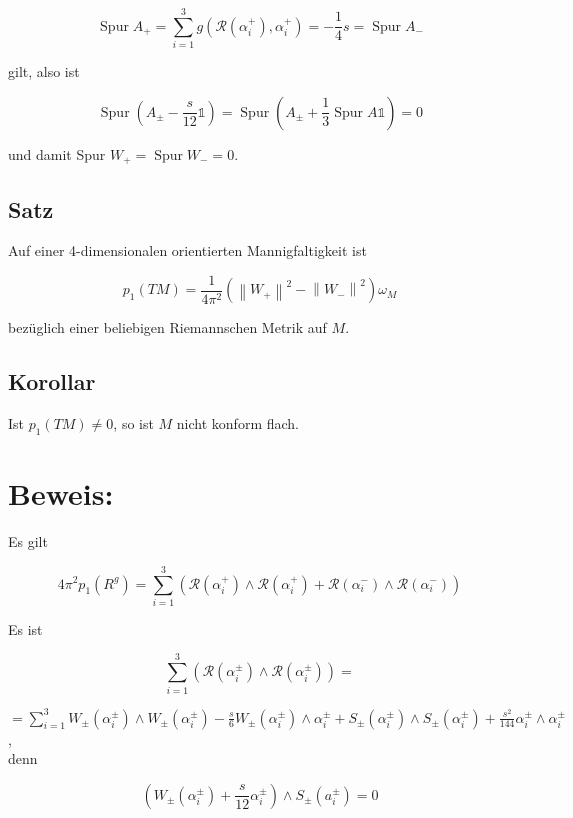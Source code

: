 \documentclass[10pt, letterpaper]{article}
\begin{document}
$$
\operatorname{Spur} A_{+}=\sum_{i=1}^{3} g\left(\mathcal{R}\left(\alpha_{i}^{+}\right), \alpha_{i}^{+}\right)=-\frac{1}{4} s=\operatorname{Spur} A_{-}
$$

gilt, also ist

$$
\operatorname{Spur}\left(A_{ \pm}-\frac{s}{12} \mathbb{1}\right)=\operatorname{Spur}\left(A_{ \pm}+\frac{1}{3} \operatorname{Spur} A \mathbb{1}\right)=0
$$

und damit Spur $W_{+}=\operatorname{Spur} W_{-}=0$.

\subsection*{Satz}
Auf einer 4-dimensionalen orientierten Mannigfaltigkeit ist

$$
p_{1}(T M)=\frac{1}{4 \pi^{2}}\left(\left\|W_{+}\right\|^{2}-\left\|W_{-}\right\|^{2}\right) \omega_{M}
$$

bezüglich einer beliebigen Riemannschen Metrik auf $M$.

\subsection*{Korollar}
Ist $p_{1}(T M) \neq 0$, so ist $M$ nicht konform flach.

\section*{Beweis:}
Es gilt

$$
4 \pi^{2} p_{1}\left(R^{g}\right)=\sum_{i=1}^{3}\left(\mathcal{R}\left(\alpha_{i}^{+}\right) \wedge \mathcal{R}\left(\alpha_{i}^{+}\right)+\mathcal{R}\left(\alpha_{i}^{-}\right) \wedge \mathcal{R}\left(\alpha_{i}^{-}\right)\right)
$$

Es ist

$$
\sum_{i=1}^{3}\left(\mathcal{R}\left(\alpha_{i}^{ \pm}\right) \wedge \mathcal{R}\left(\alpha_{i}^{ \pm}\right)\right)=
$$

$=\sum_{i=1}^{3} W_{ \pm}\left(\alpha_{i}^{ \pm}\right) \wedge W_{ \pm}\left(\alpha_{i}^{ \pm}\right)-\frac{s}{6} W_{ \pm}\left(\alpha_{i}^{ \pm}\right) \wedge \alpha_{i}^{ \pm}+S_{ \pm}\left(\alpha_{i}^{ \pm}\right) \wedge S_{ \pm}\left(\alpha_{i}^{ \pm}\right)+\frac{s^{2}}{144} \alpha_{i}^{ \pm} \wedge \alpha_{i}^{ \pm}$,\\
denn

$$
\left(W_{ \pm}\left(\alpha_{i}^{ \pm}\right)+\frac{s}{12} \alpha_{i}^{ \pm}\right) \wedge S_{ \pm}\left(a_{i}^{ \pm}\right)=0
$$
\end{document}
